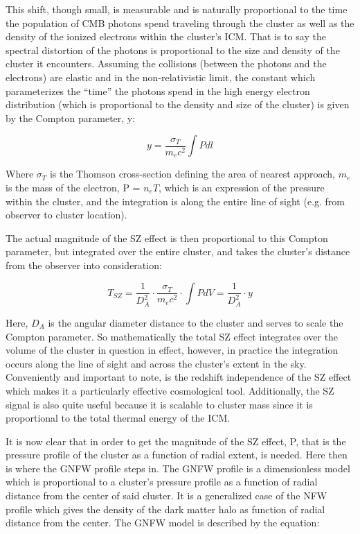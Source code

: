 \documentclass[12pt]{article} %
\begin{document}
This shift, though small, is measurable and is naturally proportional to the time the population of CMB photons spend traveling through the cluster as well as the density of the ionized electrons within the cluster’s ICM. That is to say the spectral distortion of the photons is proportional to the size and density of the cluster it encounters. Assuming the collisions (between the photons and the electrons) are elastic and in the non-relativistic limit, the constant which parameterizes the “time” the photons spend in the high energy electron distribution (which is proportional to the density and size of the cluster) is given by the Compton parameter, y: 

\begin{equation}
y =\frac{\sigma_T}{m_e  c^2} \int P dl
\end{equation}

Where $\sigma_T$ is the Thomson cross-section defining the area of nearest approach, $m_e$ is the mass of the electron, P = $ n_e T$, which is an expression of the pressure within the cluster, and the integration is along the entire line of sight (e.g. from observer to cluster location). 

The actual magnitude of the SZ effect is then proportional to this Compton parameter, but integrated over the entire cluster, and takes the cluster’s distance from the observer into consideration:

\begin{equation}
T_{SZ} = \frac{1}{D^2_A} \cdotp \frac{\sigma_T}{m_e  c^2} \cdotp \int P dV =\frac{1}{D^2_A} \cdotp y 
\end{equation}

Here, $D_A$ is the angular diameter distance to the cluster and serves to scale the Compton parameter. So mathematically the total SZ effect integrates over the volume of the cluster in question in effect, however, in practice the integration occurs along the line of sight and across the cluster’s extent in the sky.  Conveniently and important to note, is the redshift independence of the SZ effect which makes it a particularly effective cosmological tool. Additionally, the SZ signal is also quite useful because it is scalable to cluster mass since it is proportional to the total thermal energy of the ICM.

It is now clear that in order to get the magnitude of the SZ effect, P, that is the pressure profile of the cluster as a function of radial extent, is needed. Here then is where the GNFW profile steps in. The GNFW profile is a dimensionless model which is proportional to a cluster’s pressure profile as a function of radial distance from the center of said cluster. It is a generalized case of the NFW profile which gives the density of the dark matter halo as function of radial distance from the center. The GNFW model is described by the equation: 
\end{document}
